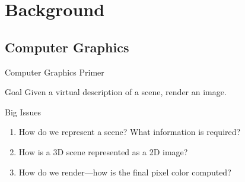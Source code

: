 \documentclass[10pt]{beamer}
\begin{document}
\section{Background}

\subsection{Computer Graphics}
\begin{frame}{Computer Graphics Primer}
  \begin{block}{Goal}
    Given a virtual description of a scene, render an image.
  \end{block}

  \begin{block}{Big Issues}
    \begin{enumerate}
      \item How do we represent a scene? What information is required?  %
      \item How is a 3D scene represented as a 2D image?  %
      \item How do we render---how is the final pixel color computed? %
    \end{enumerate}
  \end{block}
\end{frame}
\end{document}
